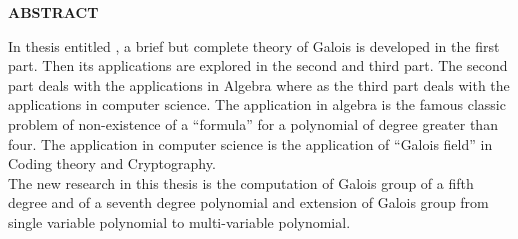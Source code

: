 \begin{center}
{\Large{\bfseries ABSTRACT}}
\end{center}
\vspace{0.7cm}

In thesis entitled \textcolor{blue}{\thetitle}, a brief but complete theory of Galois is developed in the first part. Then its applications are explored in the second and third part. The second part deals with the applications in Algebra where as the third part deals with the applications in computer science. The application in algebra is the famous classic problem of non-existence of a ``formula'' for a polynomial of degree greater than four. The application in computer science is the application of ``Galois field'' in Coding theory and Cryptography.\\

The new research in this thesis is the computation of Galois group of a fifth degree and of a seventh degree polynomial and extension of Galois group from single variable polynomial to multi-variable polynomial.

\clearpage